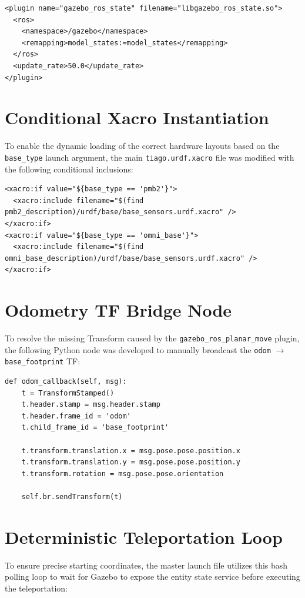 \begin{lstlisting}[style=myxml]
<plugin name="gazebo_ros_state" filename="libgazebo_ros_state.so">
  <ros>
    <namespace>/gazebo</namespace>
    <remapping>model_states:=model_states</remapping>
  </ros>
  <update_rate>50.0</update_rate>
</plugin>
\end{lstlisting}

\section{Conditional Xacro Instantiation}
To enable the dynamic loading of the correct hardware layouts based on the \texttt{base\_type} launch argument, the main \texttt{tiago.urdf.xacro} file was modified with the following conditional inclusions:
\vspace{0.3cm}

\begin{lstlisting}[style=myxml]
<xacro:if value="${base_type == 'pmb2'}">
  <xacro:include filename="$(find pmb2_description)/urdf/base/base_sensors.urdf.xacro" />
</xacro:if>
<xacro:if value="${base_type == 'omni_base'}">
  <xacro:include filename="$(find omni_base_description)/urdf/base/base_sensors.urdf.xacro" />
</xacro:if>
\end{lstlisting}


\section{Odometry TF Bridge Node}
To resolve the missing Transform caused by the \texttt{gazebo\_ros\_planar\_move} plugin, the following Python node was developed to manually broadcast the \texttt{odom} $\rightarrow$ \texttt{base\_footprint} TF:
\label{app:tf_bridge}
\vspace{0.3cm}

\begin{lstlisting}[style=mypython]
def odom_callback(self, msg):
    t = TransformStamped()
    t.header.stamp = msg.header.stamp
    t.header.frame_id = 'odom'
    t.child_frame_id = 'base_footprint'
    
    t.transform.translation.x = msg.pose.pose.position.x
    t.transform.translation.y = msg.pose.pose.position.y
    t.transform.rotation = msg.pose.pose.orientation
    
    self.br.sendTransform(t)
\end{lstlisting}


\section{Deterministic Teleportation Loop}
To ensure precise starting coordinates, the master launch file utilizes this bash polling loop to wait for Gazebo to expose the entity state service before executing the teleportation:
\label{app:teleport}
\vspace{0.3cm}

